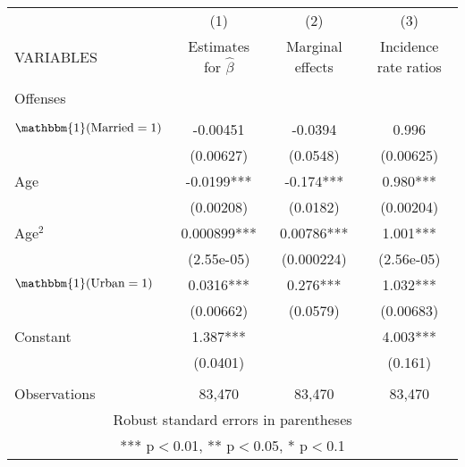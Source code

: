 \documentclass[]{article}
\begin{document}
\begin{tabular}{lccc} \hline
 & (1) & (2) & (3) \\
VARIABLES & Estimates for $\hat{\beta}$ & Marginal effects & Incidence rate ratios \\ \hline
 &  &  &  \\
Offenses &  &  &  \\
 &  &  &  \\
$\mathbbm{1}(\text{Married}=1)$ & -0.00451 & -0.0394 & 0.996 \\
 & (0.00627) & (0.0548) & (0.00625) \\
Age & -0.0199*** & -0.174*** & 0.980*** \\
 & (0.00208) & (0.0182) & (0.00204) \\
Age$^2$ & 0.000899*** & 0.00786*** & 1.001*** \\
 & (2.55e-05) & (0.000224) & (2.56e-05) \\
$\mathbbm{1}(\text{Urban}=1)$ & 0.0316*** & 0.276*** & 1.032*** \\
 & (0.00662) & (0.0579) & (0.00683) \\
Constant & 1.387*** &  & 4.003*** \\
 & (0.0401) &  & (0.161) \\
 &  &  &  \\
 Observations & 83,470 & 83,470 & 83,470 \\ \hline
\multicolumn{4}{c}{ Robust standard errors in parentheses} \\
\multicolumn{4}{c}{ *** p$<$0.01, ** p$<$0.05, * p$<$0.1} \\
\end{tabular}
\end{document}
